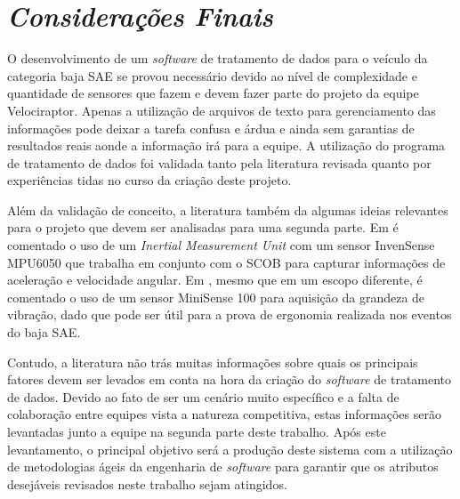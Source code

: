 \chapter{\textit{Considerações Finais}}
	\label{ch:consideracoes}
O desenvolvimento de um \textit{software} de tratamento de dados para o veículo da categoria baja SAE se provou necessário devido ao nível de complexidade e quantidade de sensores que fazem e devem fazer parte do projeto da equipe Velociraptor. Apenas a utilização de arquivos de texto para gerenciamento das informações pode deixar a tarefa confusa e árdua e ainda sem garantias de resultados reais aonde a informação irá para a equipe. A utilização do programa de tratamento de dados foi validada tanto pela literatura revisada quanto por experiências tidas no curso da criação deste projeto.

Além da validação de conceito, a literatura também da algumas ideias relevantes para o projeto que devem ser analisadas para uma segunda parte. Em  é comentado o uso de um \textit{Inertial Measurement Unit} com um sensor InvenSense MPU6050 que trabalha em conjunto com o SCOB para capturar informações de aceleração e velocidade angular. Em , mesmo que em um escopo diferente, é comentado o uso de um sensor MiniSense 100 para aquisição da grandeza de vibração, dado que pode ser útil para a prova de ergonomia realizada nos eventos do baja SAE.

Contudo, a literatura não trás muitas informações sobre quais os principais fatores devem ser levados em conta na hora da criação do \textit{software} de tratamento de dados. Devido ao fato de ser um cenário muito específico e a falta de colaboração entre equipes vista a natureza competitiva, estas informações serão levantadas junto a equipe na segunda parte deste trabalho. Após este levantamento, o principal objetivo será a produção deste sistema com a utilização de metodologias ágeis da engenharia de \textit{software} para garantir que os atributos desejáveis revisados neste trabalho sejam atingidos.        